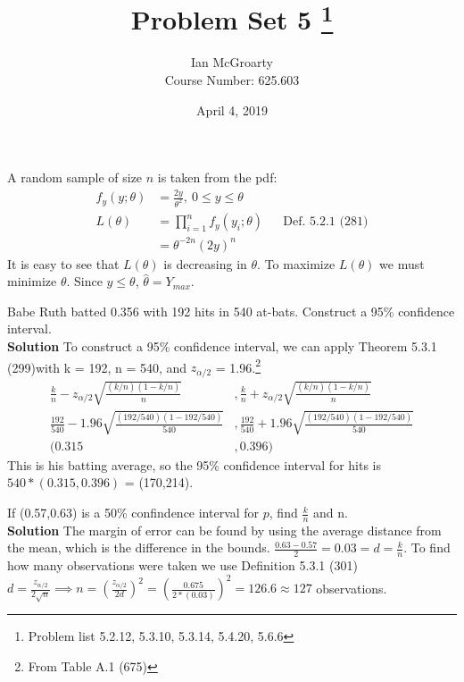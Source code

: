 \documentclass[12pt]{article}
\title{Problem Set 5 \thanks{Problem list 5.2.12, 5.3.10, 5.3.14, 5.4.20, 5.6.6}}
\author{Ian McGroarty \\
	Course Number: 625.603}
\date{April 4, 2019}
\newenvironment{problem}[2][Problem]{\begin{trivlist}
\item[\hskip \labelsep {\bfseries #1}\hskip \labelsep {\bfseries #2.}]}{\end{trivlist}}
\begin{document}
\maketitle
\newpage
\begin{problem}{5.2.12} A random sample of size $n$ is taken from the pdf: 
\begin{align*}
f_y(y;\theta ) &= \frac{2y}{\theta^2}, \ 0 \leq y \leq \theta \\ 
L(\theta) &= \prod_{i=1}^n f_y(y_i ; \theta) && \text{Def. 5.2.1 (281)} \\ 
&= \theta^{-2n}(2y)^n
\end{align*}
It is easy to see that  $L(\theta)$ is decreasing in $\theta $. To maximize $L(\theta)$ we must minimize $\theta$. Since $y \leq \theta$, $\hat{\theta}  = Y_{max}$.
\end{problem}

\begin{problem}{5.3.10} Babe Ruth batted 0.356 with 192 hits in 540 at-bats. Construct a 95\% confidence interval. \\

\textbf{Solution} To construct a 95\% confidence interval, we can apply Theorem 5.3.1 (299)with k = 192, n = 540, and $z_{\alpha / 2}$ = 1.96.\footnote{From Table A.1 (675)}
\begin{align*}
\frac{k}{n} - z_{\alpha/2}\sqrt{\frac{(k/n)(1-k/n)}{n}}&, \frac{k}{n} + z_{\alpha/2}\sqrt{\frac{(k/n)(1-k/n)}{n}} \\
\frac{192}{540} - 1.96\sqrt{\frac{(192/540)(1-192/540)}{540}}&, \frac{192}{540} + 1.96\sqrt{\frac{(192/540)(1-192/540)}{540}} \\
(0.315&,0.396)
\end{align*}
This is his batting average, so the 95\% confidence interval for hits is $540*(0.315,0.396)$ = (170,214). 
\end{problem}

\begin{problem}{5.3.14} If (0.57,0.63) is a 50\% confindence interval for $p$, find $\frac{k}{n}$ and n. \\ 
\textbf{Solution} The margin of error can be found by using the average distance from the mean, which is the difference in the bounds. $\frac{0.63-0.57}{2} = 0.03 = d = \frac{k}{n}$. To find how many observations were taken we use Definition 5.3.1 (301) $d=\frac{z_{\alpha/2}}{2\sqrt{n}} \implies n = (\frac{z_{\alpha/2}}{2d})^2 = (\frac{0.675}{2*(0.03)})^2 = 126.6 \approx 127$ observations. 
\end{problem}
\end{document}
